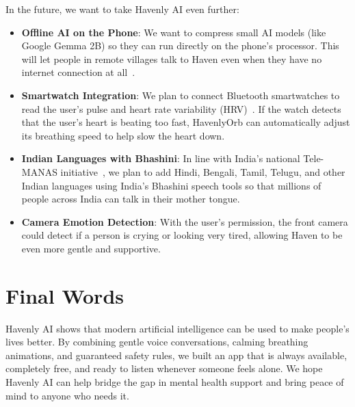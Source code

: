 In the future, we want to take Havenly AI even further:
\begin{itemize}
    \item \textbf{Offline AI on the Phone}: We want to compress small AI models (like Google Gemma 2B) so they can run directly on the phone's processor. This will let people in remote villages talk to Haven even when they have no internet connection at all~\cite{geminiteam2024gemini15}.
    \item \textbf{Smartwatch Integration}: We plan to connect Bluetooth smartwatches to read the user's pulse and heart rate variability (HRV)~\cite{lehrer2014hrv}. If the watch detects that the user's heart is beating too fast, HavenlyOrb can automatically adjust its breathing speed to help slow the heart down.
    \item \textbf{Indian Languages with Bhashini}: In line with India's national Tele-MANAS initiative~\cite{telemanas2022guidelines}, we plan to add Hindi, Bengali, Tamil, Telugu, and other Indian languages using India's Bhashini speech tools so that millions of people across India can talk in their mother tongue.
    \item \textbf{Camera Emotion Detection}: With the user's permission, the front camera could detect if a person is crying or looking very tired, allowing Haven to be even more gentle and supportive.
\end{itemize}

\section{Final Words}
\label{sec:concl_remarks}

Havenly AI shows that modern artificial intelligence can be used to make people's lives better. By combining gentle voice conversations, calming breathing animations, and guaranteed safety rules, we built an app that is always available, completely free, and ready to listen whenever someone feels alone. We hope Havenly AI can help bridge the gap in mental health support and bring peace of mind to anyone who needs it.
